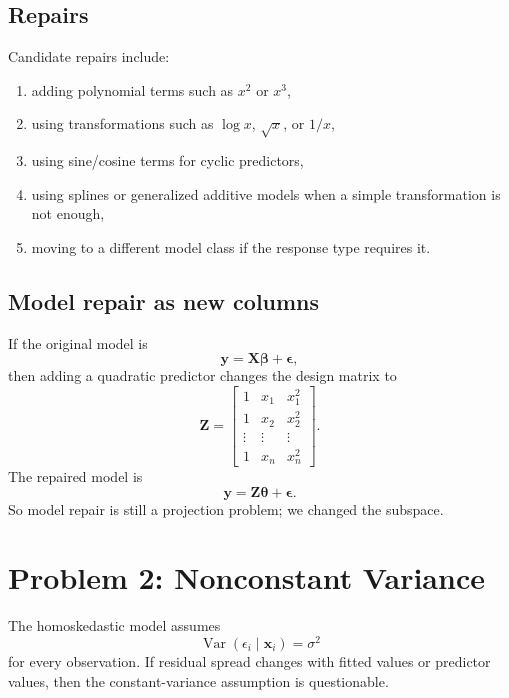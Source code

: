 \subsection*{Repairs}

Candidate repairs include:
\begin{enumerate}
  \item adding polynomial terms such as \(x^2\) or \(x^3\),
  \item using transformations such as \(\log x\), \(\sqrt{x}\), or \(1/x\),
  \item using sine/cosine terms for cyclic predictors,
  \item using splines or generalized additive models when a simple transformation is not enough,
  \item moving to a different model class if the response type requires it.
\end{enumerate}

\subsection*{Model repair as new columns}

If the original model is
\begin{equation}
  \mathbf{y}=\mathbf{X}\boldsymbol{\beta}+\boldsymbol{\epsilon},
\end{equation}
then adding a quadratic predictor changes the design matrix to
\begin{equation}
  \mathbf{Z}=\begin{bmatrix}
    1 & x_1 & x_1^2 \\
    1 & x_2 & x_2^2 \\
    \vdots & \vdots & \vdots \\
    1 & x_n & x_n^2
  \end{bmatrix}.
\end{equation}
The repaired model is
\begin{equation}
  \mathbf{y}=\mathbf{Z}\boldsymbol{\theta}+\boldsymbol{\epsilon}.
\end{equation}
So model repair is still a projection problem; we changed the subspace.

\section{Problem 2: Nonconstant Variance}

The homoskedastic model assumes
\begin{equation}
  \operatorname{Var}(\epsilon_i\mid \mathbf{x}_i)=\sigma^2
\end{equation}
for every observation.  If residual spread changes with fitted values or predictor values, then the constant-variance assumption is questionable.

